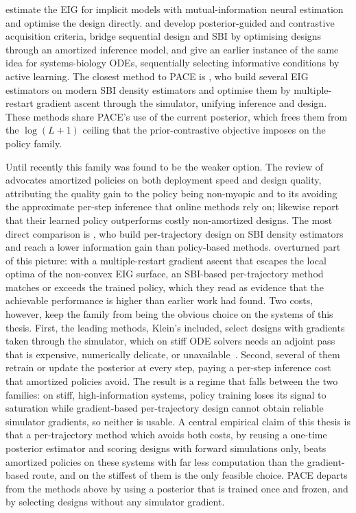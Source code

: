 \citet{kleinegesse2020bayesian} estimate the EIG for implicit models with
mutual-information neural estimation and optimise the design directly.
\citet{iollo2024pasoa} and \citet{iollo2025contrastive} develop posterior-guided and
contrastive acquisition criteria, \citet{zaballa2025bridging} bridge sequential design and
SBI by optimising designs through an amortized inference model, and
\citet{pauwels2014bayesian} give an earlier instance of the same idea for systems-biology
ODEs, sequentially selecting informative conditions by active learning. The closest method
to PACE is \citet{klein2026supercharging}, who build several EIG estimators on modern SBI
density estimators and optimise them by multiple-restart gradient ascent through the
simulator, unifying inference and design. These methods share PACE's use of the current
posterior, which frees them from the $\log(L+1)$ ceiling that the prior-contrastive
objective imposes on the policy family.

Until recently this family was found to be the weaker option. The review of
\citet{rainforth2024modern} advocates amortized policies on both deployment speed and design
quality, attributing the quality gain to the policy being non-myopic and to its avoiding the
approximate per-step inference that online methods rely on; \citet{ivanova2021implicit} likewise
report that their learned policy outperforms costly non-amortized designs. The most direct
comparison is \citet{zaballa2025bridging}, who build per-trajectory design on SBI density
estimators and reach a lower information gain than policy-based methods.
\citet{klein2026supercharging} overturned part of this picture: with a multiple-restart gradient
ascent that escapes the local optima of the non-convex EIG surface, an SBI-based per-trajectory
method matches or exceeds the trained policy, which they read as evidence that the achievable
performance is higher than earlier work had found. Two costs, however, keep the family from being
the obvious choice on the systems of this thesis. First, the leading methods, Klein's included,
select designs with gradients taken through the simulator, which on stiff ODE solvers needs an
adjoint pass that is expensive, numerically delicate, or
unavailable~\citep{klein2026supercharging,fronk2024stiff,pal2023neural}. Second, several of them
retrain or update the posterior at every step, paying a per-step inference cost that amortized
policies avoid. The result is a regime that falls between the two families: on stiff,
high-information systems, policy training loses its signal to saturation while gradient-based
per-trajectory design cannot obtain reliable simulator gradients, so neither is usable. A central
empirical claim of this thesis is that a per-trajectory method which avoids both costs, by
reusing a one-time posterior estimator and scoring designs with forward simulations only, beats
amortized policies on these systems with far less computation than the gradient-based route, and
on the stiffest of them is the only feasible choice. PACE departs from the methods above by using
a posterior that is trained once and frozen, and by selecting designs without any simulator
gradient.

